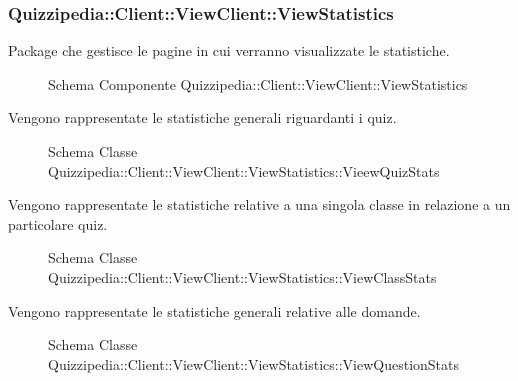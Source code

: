 \subsubsection{Quizzipedia::Client::ViewClient::ViewStatistics}
Package che gestisce le pagine in cui verranno visualizzate le statistiche.
\begin{figure}[H]
\centering
\noindent{}
\caption{Schema Componente Quizzipedia::Client::ViewClient::ViewStatistics}
\end{figure}
Vengono rappresentate le statistiche generali riguardanti i quiz.
\begin{figure}[H]
\centering
\noindent{}
\caption{Schema Classe Quizzipedia::Client::ViewClient::ViewStatistics::VieewQuizStats}
\end{figure}
Vengono rappresentate le statistiche relative a una singola classe in relazione a un particolare quiz.
\begin{figure}[H]
\centering
\noindent{}
\caption{Schema Classe Quizzipedia::Client::ViewClient::ViewStatistics::ViewClassStats}
\end{figure}
Vengono rappresentate le statistiche generali relative alle domande.
\begin{figure}[H]
\centering
\noindent{}
\caption{Schema Classe Quizzipedia::Client::ViewClient::ViewStatistics::ViewQuestionStats}
\end{figure}
